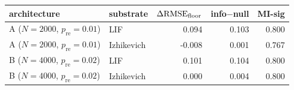 \begin{tabular}{llrrr}
\toprule
architecture & substrate & $\Delta\mathrm{RMSE}_{\mathrm{floor}}$ & info$-$null & MI-sig \\
\midrule
A ($N{=}2000$, $p_{\mathrm{re}}{=}0.01$) & LIF & 0.094 & 0.103 & 0.800 \\
A ($N{=}2000$, $p_{\mathrm{re}}{=}0.01$) & Izhikevich & -0.008 & 0.001 & 0.767 \\
B ($N{=}4000$, $p_{\mathrm{re}}{=}0.02$) & LIF & 0.101 & 0.104 & 0.800 \\
B ($N{=}4000$, $p_{\mathrm{re}}{=}0.02$) & Izhikevich & 0.000 & 0.004 & 0.800 \\
\bottomrule
\end{tabular}
